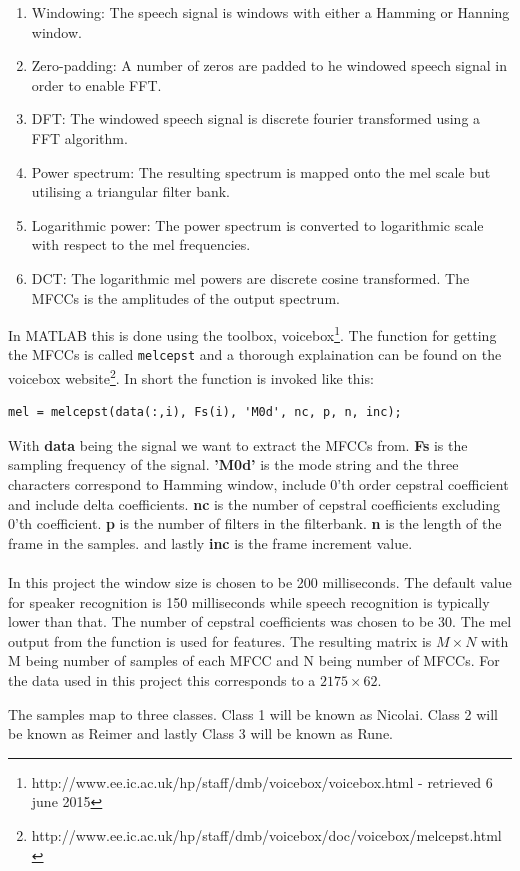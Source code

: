 \begin{enumerate}
\item Windowing: The speech signal is windows with either a Hamming or Hanning window.
\item Zero-padding: A number of zeros are padded to he windowed speech signal in order to enable FFT.
\item DFT: The windowed speech signal is discrete fourier transformed using a FFT algorithm.
\item Power spectrum: The resulting spectrum is mapped onto the mel scale but utilising a triangular filter bank.
\item Logarithmic power: The power spectrum is converted to logarithmic scale with respect to the mel frequencies.
\item DCT: The logarithmic mel powers are discrete cosine transformed. The MFCCs is the amplitudes of the output spectrum.
\end{enumerate}

In MATLAB this is done using the toolbox, voicebox\footnote{http://www.ee.ic.ac.uk/hp/staff/dmb/voicebox/voicebox.html - retrieved 6 june 2015}. The function for getting the MFCCs is called \texttt{melcepst} and a thorough explaination can be found on the voicebox website\footnote{http://www.ee.ic.ac.uk/hp/staff/dmb/voicebox/doc/voicebox/melcepst.html}. In short the function is invoked like this:
\begin{verbatim}
mel = melcepst(data(:,i), Fs(i), 'M0d', nc, p, n, inc);
\end{verbatim} 
With \textbf{data} being the signal we want to extract the MFCCs from. 
\textbf{Fs} is the sampling frequency of the signal. 
\textbf{'M0d'} is the mode string and the three characters correspond to Hamming window, include 0'th order cepstral coefficient and include delta coefficients.
\textbf{nc} is the number of cepstral coefficients excluding 0'th coefficient.
\textbf{p} is the number of filters in the filterbank.
\textbf{n} is the length of the frame in the samples.
and lastly \textbf{inc} is the frame increment value. \\\ \\

In this project the window size is chosen to be 200 milliseconds. The default value for speaker recognition is 150 milliseconds while speech recognition is typically lower than that. The number of cepstral coefficients was chosen to be 30. The mel output from the function is used for features. The resulting matrix is $M \times N$ with M being number of samples of each MFCC and N being number of MFCCs. For the data used in this project this corresponds to a $2175 \times 62$.

The samples map to three classes. Class 1 will be known as Nicolai. Class 2 will be known as Reimer and lastly Class 3 will be known as Rune.


